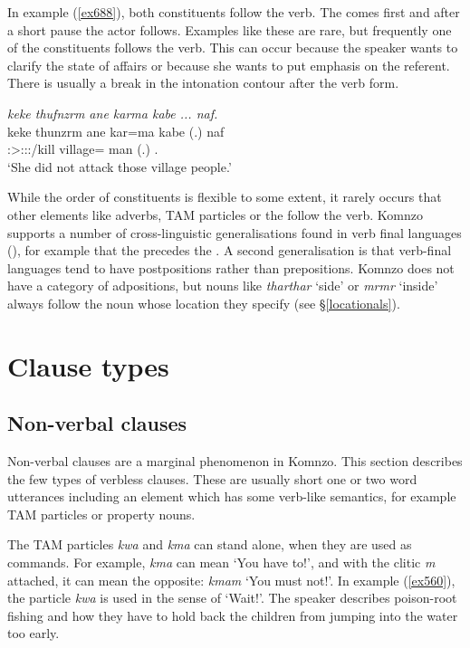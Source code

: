 In example (\ref{ex688}), both constituents follow the verb. The  comes first and after a short pause the actor follows. Examples like these are rare, but frequently one of the constituents follows the verb. This can occur because the speaker wants to clarify the state of affairs or because she wants to put emphasis on the referent. There is usually a break in the intonation contour after the verb form.

\begin{exe}
	\ex \emph{keke thufnzrm ane karma kabe ... naf.}\\
	\gll keke thunzrm ane kar=ma kabe (.) naf\\
	\Neg{} \Sg:\Sbj>\Stpl:\Obj:\Pst:\Dur/kill \Dem{} village=\Char{} man (.) \Tsg.\Erg\\
	\trans `She did not attack those village people.'
	\label{ex688}
\end{exe}

While the order of constituents is flexible to some extent, it rarely occurs that other elements like adverbs, TAM particles or the  follow the verb. Komnzo supports a number of cross-linguistic generalisations found in verb final languages (\citealt{Dryer:2007wordorder}), for example that the  precedes the . A second generalisation is that verb-final languages tend to have postpositions rather than prepositions. Komnzo does not have a category of adpositions, but  nouns like \emph{tharthar} `side' or \emph{mrmr} `inside' always follow the noun whose location they specify (see \S{}\ref{locationals}).

\section{Clause types}\label{clause types}

\subsection{Non-verbal clauses}\label{nonverbalclauses}

Non-verbal clauses are a marginal phenomenon in Komnzo. This section describes the few types of verbless clauses. These are usually short one or two word utterances including an element which has some verb-like semantics, for example TAM particles or property nouns.

The TAM particles \emph{kwa} \Fut{} and \emph{kma} \Pot{} can stand alone, when they are used as commands. For example, \emph{kma} can mean `You have to!', and with the  clitic \emph{m} attached, it can mean the opposite: \emph{kmam} `You must not!'. In example (\ref{ex560}), the  particle \emph{kwa} is used in the sense of `Wait!'. The speaker describes poison-root fishing and how they have to hold back the children from jumping into the water too early.

